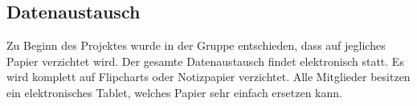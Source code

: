 \subsection{Datenaustausch}

Zu Beginn des Projektes wurde in der Gruppe entschieden, dass auf jegliches Papier verzichtet wird. Der gesamte Datenaustausch findet elektronisch statt. Es wird komplett auf Flipcharts oder Notizpapier verzichtet. Alle Mitglieder besitzen ein elektronisches Tablet, welches Papier sehr einfach ersetzen kann.